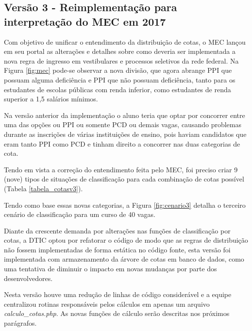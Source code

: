 \subsection{Versão 3 - Reimplementação para interpretação do MEC em 2017 }
\label{versao3}

Com objetivo de unificar o entendimento da distribuição de cotas, o \gls{MEC} lançou em seu portal as alterações e detalhes sobre como deveria ser implementada a nova regra de ingresso em vestibulares e processos seletivos da rede federal. Na Figura \ref{fig:mec} pode-se observar a nova divisão, que agora abrange \gls{PPI} que possuam alguma deficiência e \gls{PPI} que não possuam deficiência, tanto para os estudantes de escolas públicas com renda inferior, como estudantes de renda superior a 1,5 salários mínimos. 




Na versão anterior da implementação o aluno teria que optar por concorrer entre uma das opções ou \gls{PPI} ou somente \gls{PCD} ou demais vagas, causando problemas durante as inscrições de várias instituições de ensino, pois haviam candidatos que eram tanto \gls{PPI} como \gls{PCD} e tinham direito a concorrer nas duas categorias de cota.

Tendo em vista a correção do entendimento feita pelo \gls{MEC}, foi preciso criar 9 (nove) tipos de situações de classificação para cada combinação de cotas possível (Tabela \ref{tabela_cotasv3}).



Tendo como base essas novas categorias, a Figura \ref{fig:cenario3} detalha o terceiro cenário de classificação para um curso de 40 vagas. 



\newpage
Diante da crescente demanda por alterações nas funções de classificação por cotas, a \gls{DTIC} optou por refatorar o código de modo que as regras de distribuição não fossem implementadas de forma estática no código fonte, esta versão foi implementada com armazenamento da árvore de cotas em banco de dados, como uma tentativa de diminuir o impacto em novas mudanças por parte dos desenvolvedores. 

Nesta versão houve uma redução de linhas de código considerável e a equipe centralizou rotinas responsáveis pelos cálculos em apenas um arquivo \textit{calculo\_cotas.php}. As novas funções de cálculo serão descritas nos próximos parágrafos.

